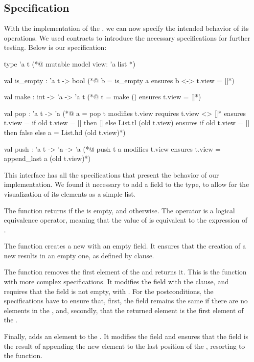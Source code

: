 \subsection{Specification}
\label{subsec:specification}

With the implementation of the , we can now specify the intended behavior 
of its operations. We used \gospellang contracts to introduce the necessary specifications 
for further testing. Below is our specification:

\begin{gospel}
    type 'a t
    (*@ mutable model view: 'a list *)

    val is_empty : 'a t -> bool
    (*@ b = is_empty a 
        ensures b <-> t.view = []*)

    val make : int -> 'a -> 'a t
    (*@ t = make ()
        ensures t.view = []*)

    val pop : 'a t -> 'a
    (*@ a = pop t 
        modifies t.view
        requires t.view <> []*
        ensures t.view = 
            if old t.view = []
            then [] 
            else List.tl (old t.view)
        ensures if old t.view = [] then false
            else a = List.hd (old t.view)*)

    val push : 'a t -> 'a -> 'a
    (*@ push t a
        modifies t.view
        ensures t.view = append_last a (old t.view)*)
\end{gospel}

This interface has all the specifications that present the behavior of our  
implementation. We found it necessary to add a  field to the  
type, to allow for the visualization of its elements as a simple \ocaml list. 

The  function returns  if the  is empty, and 
 otherwise. The \gosp{<->} operator is a logical equivalence operator, 
meaning that the value of  is equivalent to the expression of . 

The  function creates a new  with an empty  field. 
It ensures that the creation of a new  results in an empty one, as 
defined by  clause.

The  function removes the first element of the  and returns it. 
This is the function with more complex specifications. It modifies the  field 
with the  clause, and requires that the  field is not empty, with 
. For the postconditions, the specifications have to ensure that, first, 
the  field remains the same if there are no elements in the , 
and, secondly, that the returned element is the first element of the .

Finally,  adds an element to the . It modifies the  field 
and ensures that the  field is the result of appending the new element to the 
last position of the , resorting to the  function.
